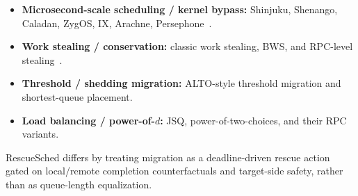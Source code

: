 \begin{itemize}
  \item \textbf{Microsecond-scale scheduling / kernel bypass:} Shinjuku,
  Shenango, Caladan, ZygOS, IX, Arachne, Persephone~\cite{placeholder-shinjuku}.
  \item \textbf{Work stealing / conservation:} classic work stealing,
  BWS, and RPC-level stealing~\cite{placeholder-workstealing}.
  \item \textbf{Threshold / shedding migration:} ALTO-style threshold
  migration and shortest-queue placement.
  \item \textbf{Load balancing / power-of-$d$:} JSQ, power-of-two-choices,
  and their RPC variants.
\end{itemize}
RescueSched differs by treating migration as a deadline-driven rescue
action gated on local/remote completion counterfactuals and target-side
safety, rather than as queue-length equalization.